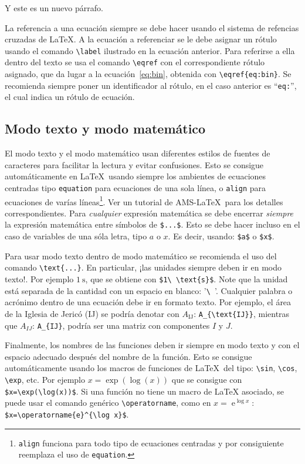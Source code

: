 \documentclass{article}
\begin{document}
Y este es un nuevo párrafo. 

La referencia a una ecuación siempre se debe hacer usando el sistema de refencias cruzadas de \LaTeX{}. A la ecuación a referenciar se le debe asignar un rótulo usando el comando \verb|\label| ilustrado en la ecuación anterior. Para referirse a ella dentro del texto se usa el comando \verb|\eqref| con el correspondiente rótulo asignado, que da lugar a la ecuación~\eqref{eq:bin}, obtenida con \verb|\eqref{eq:bin}|. Se recomienda siempre poner un identificador al rótulo, en el caso anterior es ``\verb|eq:|'', el cual indica un rótulo de ecuación.

\subsection{Modo texto y modo matemático}

El modo texto y el modo matemático usan diferentes estilos de fuentes de caracteres para facilitar la lectura y evitar confusiones. Esto se consigue automáticamente en \LaTeX\ usando siempre los ambientes de ecuaciones centradas tipo \verb|equation| para ecuaciones de una sola línea, o \verb|align| para ecuaciones de varías 
líneas\footnote{\texttt{align} funciona para todo tipo de ecuaciones centradas y por consiguiente reemplaza el uso de \texttt{equation}. }.
Ver un tutorial de AMS-\LaTeX\ para los detalles correspondientes. Para \emph{cualquier} expresión matemática se debe encerrar  \emph{siempre} la expresión matemática entre símbolos de \verb|$...$|.
Esto se debe hacer incluso en el caso de variables de una sóla letra, tipo $a$ o $x$. Es decir, usando: \verb|$a$| o \verb|$x$|.

Para usar modo texto dentro de modo matemático se recomienda el uso del comando \verb|\text{...}|. En particular, ¡las unidades siempre deben ir en modo texto!. Por ejemplo $1\ \text{s}$, que se obtiene con \verb|$1\ \text{s}$|. Note que la unidad está separada de la cantidad con un espacio en blanco: '\verb|\ |'. Cualquier palabra o acrónimo dentro de una ecuación debe ir en formato texto. Por ejemplo, el área de la Iglesia de Jericó (IJ) se podría denotar con $A_{\text{IJ}}$: \verb|A_{\text{IJ}}|, mientras que $A_{IJ}$: \verb|A_{IJ}|, podría ser una matriz con componentes $I$ y $J$.

Finalmente, los nombres de las funciones deben ir siempre en modo texto y con el espacio adecuado después del nombre de la función. Esto se consigue automáticamente usando los macros de funciones de \LaTeX\ del tipo: \verb|\sin|, \verb|\cos|, \verb|\exp|, etc. Por ejemplo $x=\exp(\log(x))$  que se consigue con \verb|$x=\exp(\log(x))$|. Si una función no tiene un macro de \LaTeX{} asociado, se puede usar el comando genérico \verb|\operatorname|, como en  $x=\operatorname{e}^{\log x}$: \verb|$x=\operatorname{e}^{\log x}$|.
\end{document}
